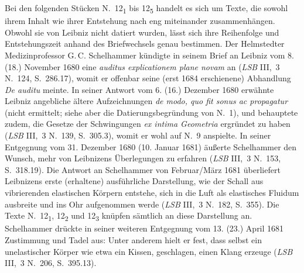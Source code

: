 %
%
%
%
\footnotesize%
\pstart%
\noindent%
\label{cogitationesnovae-intro}%
Bei den folgenden Stücken N.~12\textsubscript{1} bis 12\textsubscript{5} handelt es sich um Texte, die sowohl ihrem Inhalt wie ihrer Entstehung nach eng miteinander zusammenhängen.
Obwohl sie von Leibniz nicht datiert wurden, lässt sich ihre Reihenfolge und Entstehungszeit anhand des Briefwechsels genau bestimmen. 
\pend\pstart%
Der Helmstedter Medizinprofessor G.\,C. Schelhammer\protect{} kündigte in seinem Brief an Leibniz vom 8. (18.) November 1680 eine \textit{auditus explicationem plane novam} an (\cite{01279}\textit{LSB} III,~3 N.~124, S.~286.17), womit er offenbar seine (erst 1684 erschienene) Abhandlung \cite{01204}\textit{De auditu} meinte.
In seiner Antwort vom 6. (16.) Dezember 1680 erwähnte Leibniz angebliche ältere Aufzeichnungen \textit{de modo, quo fit sonus ac propagatur} (nicht ermittelt; siehe aber die Datierungsbegründung von N.~1), %
und behauptete zudem, die Gesetze der Schwingungen \textit{ex intima Geometria} ergründet zu haben (\cite{01275}\textit{LSB} III,~3 N.~139, S.~305.3), womit er wohl auf N.~9 anspielte.
In seiner Entgegnung vom 31. Dezember 1680 (10. Januar 1681) äußerte Schelhammer den Wunsch, mehr von Leibnizens Überlegungen zu erfahren (\cite{01280}\textit{LSB} III,~3 N.~153, S.~318.19).
Die Antwort an Schelhammer von Februar/März 1681 überliefert Leibnizens erste (erhaltene) ausführliche Darstellung, wie der Schall aus vibrierenden elastischen Körpern entstehe, sich in die Luft als elastisches Fluidum ausbreite und ins Ohr aufgenommen werde (\cite{01194}\textit{LSB} III,~3 N.~182, S.~355).
Die Texte N.~12\textsubscript{1}, 12\textsubscript{2} und 12\textsubscript{3} knüpfen sämtlich an diese Darstellung an. %
Schelhammer drückte in seiner weiteren Entgegnung vom 13. (23.) April 1681 Zustimmung und Tadel aus:
Unter anderem hielt er fest, dass selbst ein unelastischer Körper wie etwa ein Kissen, geschlagen, %
einen Klang erzeuge (\cite{01200}\textit{LSB} III,~3 N.~206, S.~395.13).
